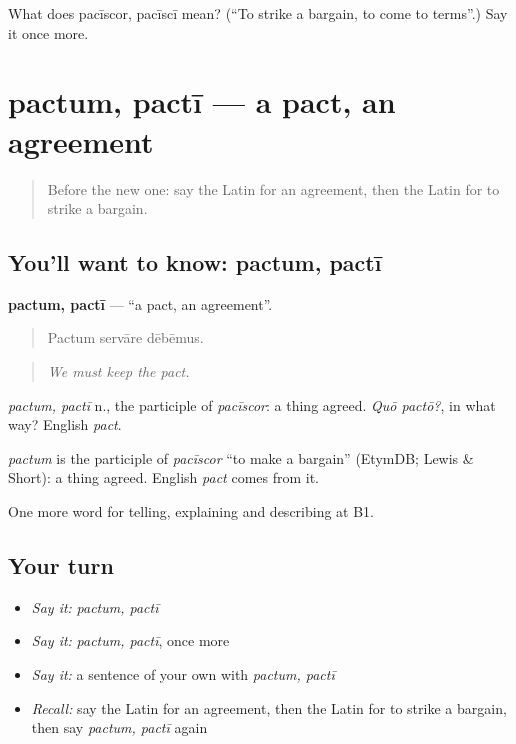 \begin{tcolorbox}[breakable,colback=teal!4,colframe=teal!35!black,title={Before you move on}]
What does pacīscor, pacīscī mean? (\textquotedblleft{}To strike a bargain, to come to terms\textquotedblright{}.) Say it once more.
\end{tcolorbox}
\section[pactum, pactī]{pactum, pactī — a pact, an agreement}

\label{lesson:LA-C397-pactum}



\begin{quote}
Before the new one: say the Latin for an agreement, then the Latin for to strike a bargain.
\end{quote}

\subsection*{You'll want to know: pactum, pactī}
\textbf{pactum, pactī} — \textquotedblleft{}a pact, an agreement\textquotedblright{}.

\begin{quote}
Pactum servāre dēbēmus.
\end{quote}

\begin{quote}
\emph{We must keep the pact.}
\end{quote}

\emph{pactum, pactī} n., the participle of \emph{pacīscor}: a thing agreed. \emph{Quō pactō?}, in what way? English \emph{pact}.

\begin{cousinweb}
\emph{pactum} is the participle of \emph{pacīscor} \textquotedblleft{}to make a bargain\textquotedblright{} (EtymDB; Lewis \& Short): a thing agreed. English \emph{pact} comes from it.
\end{cousinweb}

\begin{grammarlens}[title={What you've built}]
One more word for telling, explaining and describing at B1.
\end{grammarlens}

\subsection*{Your turn}
\begin{itemize}
\raggedright
  \item \emph{Say it:} \emph{pactum, pactī}
  \item \emph{Say it:} \emph{pactum, pactī}, once more
  \item \emph{Say it:} a sentence of your own with \emph{pactum, pactī}
  \item \emph{Recall:} say the Latin for an agreement, then the Latin for to strike a bargain, then say \emph{pactum, pactī} again
\end{itemize}

